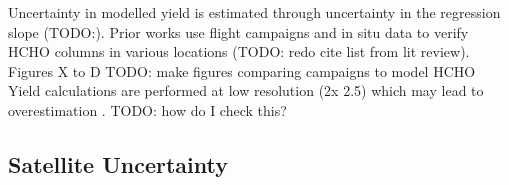     Uncertainty in modelled yield is estimated through uncertainty in the regression slope (TODO:).
    Prior works use flight campaigns and in situ data to verify HCHO columns in various locations (TODO: redo cite list from lit review).
    Figures X to D TODO: make figures comparing campaigns to model HCHO
    Yield calculations are performed at low resolution (2\degr x 2.5\degr) which may lead to overestimation \parencite{Yu2016}.
    TODO: how do I check this?
    
  \subsection{Satellite Uncertainty}
    \label{BioIsop:uncertainty:satellite}
    
